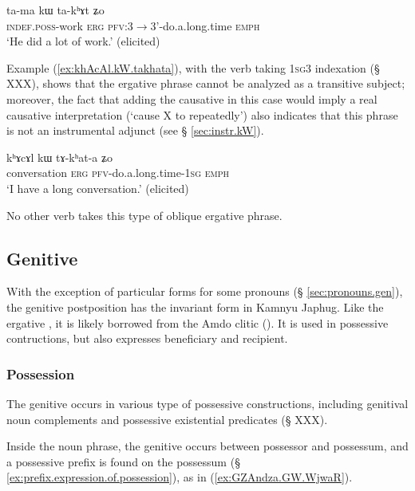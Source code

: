   \begin{exe}
\ex \label{ex:tama.kW.takhAt}
\gll ta-ma kɯ ta-kʰɤt ʑo  \\
\textsc{indef.poss}-work \textsc{erg} \textsc{pfv}:3$\rightarrow$3'-do.a.long.time \textsc{emph} \\
\glt `He did a lot of work.' (elicited)
\end{exe}

Example (\ref{ex:khAcAl.kW.takhata}), with the verb   taking \textsc{1sg}\fl{}3 indexation (§ XXX), shows that the ergative phrase cannot be analyzed as a transitive subject; moreover, the fact that adding the causative in this case would imply a real causative interpretation (`cause X to repeatedly') also indicates that this phrase is not an instrumental adjunct (see § \ref{sec:instr.kW}).

  \begin{exe}
\ex \label{ex:khAcAl.kW.takhata}
\gll kʰɤcɤl kɯ tɤ-kʰat-a ʑo \\
conversation \textsc{erg} \textsc{pfv}-do.a.long.time-\textsc{1sg} \textsc{emph} \\
\glt `I have a long conversation.' (elicited)
\end{exe}

No other verb takes this type of oblique ergative phrase.

\subsection{Genitive} \label{sec:genitive}
With the exception of particular forms for some pronouns (§ \ref{sec:pronouns.gen}), the genitive postposition has the invariant form  in Kamnyu Japhug. Like the ergative , it is likely borrowed from the Amdo clitic  (\citealt[62]{haller04themchen}). It is used in possessive contructions, but also expresses beneficiary and recipient.

\subsubsection{Possession} \label{sec:gen.possession}
The genitive  occurs in various type of possessive constructions, including genitival noun complements and possessive existential predicates (§ XXX).

Inside the noun phrase, the genitive occurs between possessor and possessum, and a possessive prefix is found on the possessum (§ \ref{ex:prefix.expression.of.possession}), as in (\ref{ex:GZAndza.GW.WjwaR}).  


